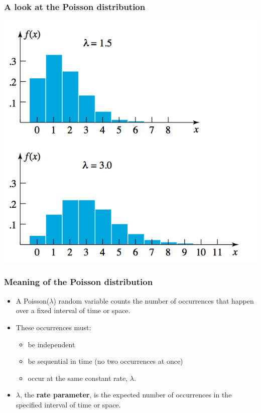 \documentclass[handout]{beamer}\usepackage{graphicx, color}
\numberwithin{equation}{section}
\begin{document}
\begin{frame}
\frametitle{A look at the Poisson distribution}
\begin{center}
 \includegraphics{../../fig/poissonbar.png}
\end{center}
\end{frame}

\begin{frame}
\frametitle{Meaning of the Poisson distribution}
\begin{itemize}
\pause \item A Poisson($\lambda$) random variable counts the number of occurrences that happen over a fixed interval of time or space.
\pause \item These occurrences must:
\begin{itemize}
\pause \item be independent
\pause \item be sequential in time (no two occurrences at once)
\pause \item occur at the same constant rate, $\lambda$.
\end{itemize}
\pause \item $\lambda$, the {\bf rate parameter}, is the expected number of occurrences in the specified interval of time or space.
\end{itemize}
\end{frame}
\end{document}
